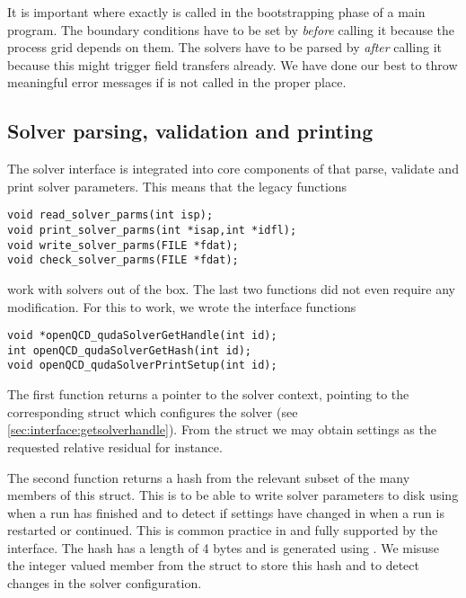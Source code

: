 It is important where exactly  is called in the bootstrapping phase of a main program.
The boundary conditions have to be set by  \emph{before} calling it because the process grid depends on them.
The solvers have to be parsed by  \emph{after} calling it because this might trigger field transfers already.
We have done our best to throw meaningful error messages if  is not called in the proper place.

\subsection{Solver parsing, validation and printing}
\label{sec:interface:legacy}

The \quda solver interface is integrated into core components of \openqxd that parse, validate and print solver parameters.
This means that the legacy functions
\begin{verbatim}
void read_solver_parms(int isp);
void print_solver_parms(int *isap,int *idfl);
void write_solver_parms(FILE *fdat);
void check_solver_parms(FILE *fdat);
\end{verbatim}
work with \quda solvers out of the box.
The last two functions did not even require any modification.
For this to work, we wrote the interface functions
\begin{verbatim}
void *openQCD_qudaSolverGetHandle(int id);
int openQCD_qudaSolverGetHash(int id);
void openQCD_qudaSolverPrintSetup(int id);
\end{verbatim}

The first function returns a pointer to the solver context, \ie pointing to the corresponding  struct which configures the solver (see \cref{sec:interface:getsolverhandle}).
From the struct we may obtain settings as the requested relative residual for instance.

The second function returns a hash from the relevant subset of the many members of this struct.
This is to be able to write \quda solver parameters to disk using  when a run has finished and to detect if settings have changed in  when a run is restarted or continued.
This is common practice in \openqxd and fully supported by the interface.
The hash has a length of \num{4} bytes and is generated using .
We misuse the integer valued member  from the  struct to store this hash and to detect changes in the solver configuration.

